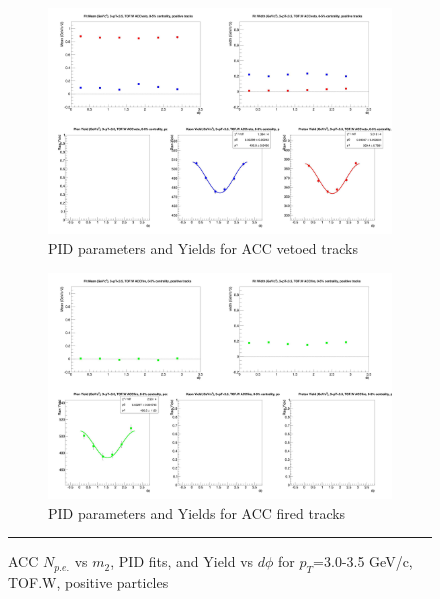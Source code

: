 \begin{figure}[H]
  \ContinuedFloat
    \begin{subfigure}{1\textwidth}
    \includegraphics[width=1\textwidth]{hiptfits/pos/fitParams_tof2_cent0_ch1_pT-30-35.jpg}
    \caption{PID parameters and Yields for ACC vetoed tracks}
    \end{subfigure}    
    \begin{subfigure}{1\textwidth}
    \includegraphics[width=1\textwidth]{hiptfits/pos/fitParams_tof3_cent0_ch1_pT-30-35.jpg}
    \caption{PID parameters and Yields for ACC fired tracks}
    \end{subfigure} 
    \rule{35em}{0.5pt}
  \caption[ACC $N_{p.e.}$ vs $m_2$, PID fits, and Yield vs $d\phi$ for $p_T$=3.0-3.5 GeV/c, TOF.W, positive particles]{ACC $N_{p.e.}$ vs $m_2$, PID fits, and Yield vs $d\phi$ for $p_T$=3.0-3.5 GeV/c, TOF.W, positive particles}
  \label{fig:acc30-35pos}
\end{figure}

